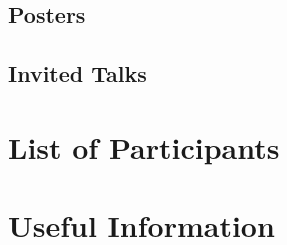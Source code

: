 \documentclass[openany, parskip=full, 12pt, a4]{scrbook}
\begin{document}
\vspace{-2.5em}

\section{Posters}















\section{Invited Talks}




\chapter{List of Participants}
 

 
\chapter{Useful Information}





\pagecolor{myblue}
\thispagestyle{empty}
\mbox{}
\end{document}
